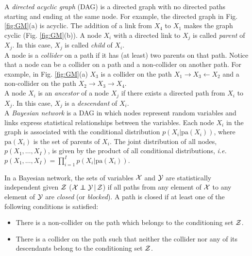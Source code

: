 \documentclass[runningheads]{llncs}
\newcommand{\figref}[1]{Fig. \ref{#1}}
\newcommand\independent{\protect\mathpalette{\protect\independenT}{\perp}}
\def\independenT#1#2{\mathrel{\rlap{$#1#2$}\mkern2mu{#1#2}}}
\newcommand\ci{\independent}
\newcommand{\ie}{\emph{i.e.}}
\begin{document}
\begin{subappendices}
\noindent A \emph{directed acyclic graph} (DAG) is a directed graph with no directed paths starting and ending at the same node. For example, the directed graph in \figref{fig:GM}(a) is acyclic. The addition of a link from $X_4$ to $X_1$ makes the graph cyclic (\figref{fig:GM}(b)). %
A node $X_i$ with a directed link to $X_j$ is called \emph{parent}
of $X_j$. In this case, $X_j$ is called \emph{child} of $X_i$.\\[5pt] 
A node is a \emph{collider} on a path if it has (at least) two parents on that path.
Notice that a node can be a collider on a path and a non-collider on another path. For example, in \figref{fig:GM}(a) $X_3$ is a collider on the path $X_1 \rightarrow X_3 \leftarrow X_2$ and a non-collider on the path $X_2\rightarrow X_3\rightarrow X_4$.\\[5pt]
A node $X_i$ is an \emph{ancestor} of a node $X_j$ if there exists a directed path from $X_i$ to $X_j$. In this case, $X_j$ is a \emph{descendant} of $X_i$.\\[5pt]
A \emph{Bayesian network} is a DAG in which nodes represent random variables and links express statistical relationships between the variables. Each node $X_i$ in the graph is associated with the conditional distribution $p(X_i|\text{pa}(X_i))$, where $\text{pa}(X_i)$ is the set of parents of $X_i$. The joint distribution of all nodes, $p(X_1,\ldots,X_I)$, is given by the product of all conditional distributions, \ie~$p(X_1,\ldots,X_I)=\prod_{i=1}^Ip(X_i|\text{pa}(X_i))$.

In a Bayesian network, the sets of variables ${\cal X}$ and ${\cal Y}$ are statistically independent given ${\cal Z}$ (${\cal X} \ci {\cal Y} \,|\, {\cal Z}$) if all paths
from any element of ${\cal X}$ to any element of ${\cal Y}$ are \emph{closed} (or \emph{blocked}). A path is closed if at least one of the following conditions is satisfied:
\begin{itemize}
\item[(a)] There is a non-collider on the path which belongs to the conditioning set ${\cal Z}$.
\item[(b)] There is a collider on the path such that neither the collider nor any of its descendants belong to the conditioning set ${\cal Z}$.
\end{itemize}


\end{subappendices}
\end{document}
